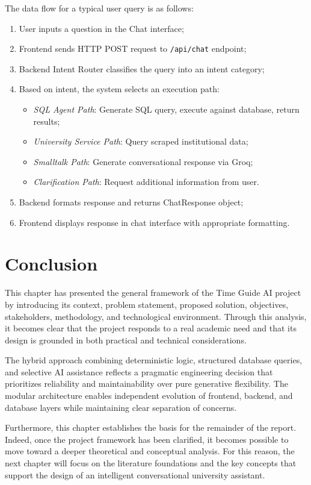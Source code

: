 The data flow for a typical user query is as follows:

\begin{enumerate}
    \item User inputs a question in the Chat interface;
    \item Frontend sends HTTP POST request to \texttt{/api/chat} endpoint;
    \item Backend Intent Router classifies the query into an intent category;
    \item Based on intent, the system selects an execution path:
    \begin{itemize}
        \item \textit{SQL Agent Path}: Generate SQL query, execute against database, return results;
        \item \textit{University Service Path}: Query scraped institutional data;
        \item \textit{Smalltalk Path}: Generate conversational response via Groq;
        \item \textit{Clarification Path}: Request additional information from user.
    \end{itemize}
    \item Backend formats response and returns ChatResponse object;
    \item Frontend displays response in chat interface with appropriate formatting.
\end{enumerate}

\section{Conclusion}
This chapter has presented the general framework of the Time Guide AI project by introducing its context, problem statement, proposed solution, objectives, stakeholders, methodology, and technological environment. Through this analysis, it becomes clear that the project responds to a real academic need and that its design is grounded in both practical and technical considerations.

The hybrid approach combining deterministic logic, structured database queries, and selective AI assistance reflects a pragmatic engineering decision that prioritizes reliability and maintainability over pure generative flexibility. The modular architecture enables independent evolution of frontend, backend, and database layers while maintaining clear separation of concerns.

Furthermore, this chapter establishes the basis for the remainder of the report. Indeed, once the project framework has been clarified, it becomes possible to move toward a deeper theoretical and conceptual analysis. For this reason, the next chapter will focus on the literature foundations and the key concepts that support the design of an intelligent conversational university assistant.
